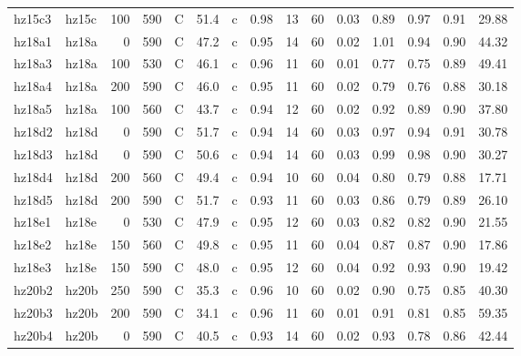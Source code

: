 \documentclass{article}
\begin{document}
\begin{landscape}
\begin{longtable}{llrrlrlrrrrrrrr}
      hz15c3 &      hz15c &  100 &  590 &     C &    51.4 &   c &  0.98 &  13 &         60 &  0.03 &  0.89 &  0.97 &  0.91 &   29.88 \\
      hz18a1 &      hz18a &    0 &  590 &     C &    47.2 &   c &  0.95 &  14 &         60 &  0.02 &  1.01 &  0.94 &  0.90 &   44.32 \\
      hz18a3 &      hz18a &  100 &  530 &     C &    46.1 &   c &  0.96 &  11 &         60 &  0.01 &  0.77 &  0.75 &  0.89 &   49.41 \\
      hz18a4 &      hz18a &  200 &  590 &     C &    46.0 &   c &  0.95 &  11 &         60 &  0.02 &  0.79 &  0.76 &  0.88 &   30.18 \\
      hz18a5 &      hz18a &  100 &  560 &     C &    43.7 &   c &  0.94 &  12 &         60 &  0.02 &  0.92 &  0.89 &  0.90 &   37.80 \\
      hz18d2 &      hz18d &    0 &  590 &     C &    51.7 &   c &  0.94 &  14 &         60 &  0.03 &  0.97 &  0.94 &  0.91 &   30.78 \\
      hz18d3 &      hz18d &    0 &  590 &     C &    50.6 &   c &  0.94 &  14 &         60 &  0.03 &  0.99 &  0.98 &  0.90 &   30.27 \\
      hz18d4 &      hz18d &  200 &  560 &     C &    49.4 &   c &  0.94 &  10 &         60 &  0.04 &  0.80 &  0.79 &  0.88 &   17.71 \\
      hz18d5 &      hz18d &  200 &  590 &     C &    51.7 &   c &  0.93 &  11 &         60 &  0.03 &  0.86 &  0.79 &  0.89 &   26.10 \\
      hz18e1 &      hz18e &    0 &  530 &     C &    47.9 &   c &  0.95 &  12 &         60 &  0.03 &  0.82 &  0.82 &  0.90 &   21.55 \\
      hz18e2 &      hz18e &  150 &  560 &     C &    49.8 &   c &  0.95 &  11 &         60 &  0.04 &  0.87 &  0.87 &  0.90 &   17.86 \\
      hz18e3 &      hz18e &  150 &  590 &     C &    48.0 &   c &  0.95 &  12 &         60 &  0.04 &  0.92 &  0.93 &  0.90 &   19.42 \\
      hz20b2 &      hz20b &  250 &  590 &     C &    35.3 &   c &  0.96 &  10 &         60 &  0.02 &  0.90 &  0.75 &  0.85 &   40.30 \\
      hz20b3 &      hz20b &  200 &  590 &     C &    34.1 &   c &  0.96 &  11 &         60 &  0.01 &  0.91 &  0.81 &  0.85 &   59.35 \\
      hz20b4 &      hz20b &    0 &  590 &     C &    40.5 &   c &  0.93 &  14 &         60 &  0.02 &  0.93 &  0.78 &  0.86 &   42.44 \\

\end{longtable}
\end{landscape}
\end{document}
